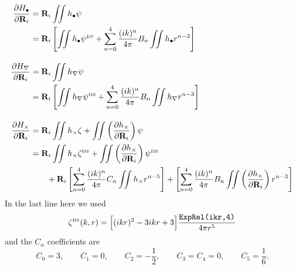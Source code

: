 \documentclass[dvips,letterpaper]{article}
\begin{document}
\begin{align*}
  \frac{\partial H_\bullet}{\partial \mathbf{R}_i}
&= \mathbf{R}_i \iint h_\bullet \psi  
\\
&= \mathbf{R}_i \left[ \iint h_{\bullet} \psi^{\hbox{\tiny{DS}}}
                 +\sum_{n=0}^4 \frac{(ik)^n}{4\pi} B_n 
                  \iint h_{\bullet} r^{n-3}
           \right]
\\[10pt]
  \frac{\partial H_\nabla}{\partial \mathbf{R}_i}
&= \mathbf{R}_i \iint h_\nabla \psi  
\\
&= \mathbf{R}_i \left[ \iint h_{\nabla} \psi^{\hbox{\tiny{DS}}}
                 +\sum_{n=0}^4 \frac{(ik)^n}{4\pi} B_n 
                  \iint h_{\nabla } r^{n-3}
           \right]
\\[10pt]
  \frac{\partial H_\times}{\partial \mathbf{R}_i}
&=   \mathbf{R}_i \iint h_\times \zeta
   + \iint \left( \frac{\partial h_\times}{\partial \mathbf{R}_i}\right) \psi
\\
&= \mathbf{R}_i \iint h_{\times} \zeta^{\hbox{\tiny{DS}}}
    +\iint \left(\frac{\partial h_\times}{\partial \mathbf{R}_i}\right)\psi^{\hbox{\tiny{DS}}}   
\\ 
&\qquad
   +\mathbf{R}_i \left[ \sum_{n=0}^4 \frac{(ik)^n}{4\pi} C_n 
                   \iint h_{\times } r^{n-5}
            \right]
   + \left[ \sum_{n=0}^4 \frac{(ik)^n}{4\pi} B_n 
            \iint \left( \frac{\partial h_{\times}}{\partial \mathbf{R}_i}\right) r^{n-3}
     \right]
\end{align*}
In the last line here we used
$$ \zeta^{\hbox{\tiny{DS}}}(k, r) = 
   \Big[ (ikr)^2 -3ikr + 3\Big]\frac{\texttt{ExpRel(ikr,4)}}{4\pi r^5} 
$$
and the $C_n$ coefficients are 
$$ C_0=3, \qquad C_1=0, \qquad C_2=-\frac{1}{2}, 
   \qquad C_3=C_4=0, \qquad C_5=\frac{1}{6}.
$$

\appendix

 
 
\end{document}
